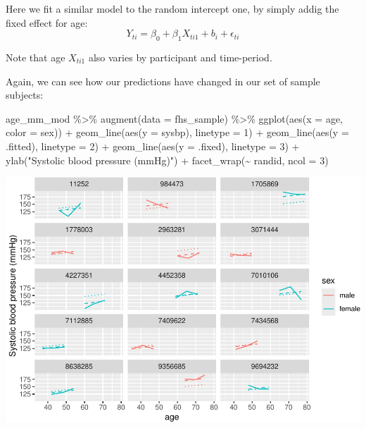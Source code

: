 \documentclass[
]{book}
\newenvironment{Shaded}{\begin{snugshade}}{\end{snugshade}}
\newcommand{\AttributeTok}[1]{\textcolor[rgb]{0.77,0.63,0.00}{#1}}
\newcommand{\DecValTok}[1]{\textcolor[rgb]{0.00,0.00,0.81}{#1}}
\newcommand{\FunctionTok}[1]{\textcolor[rgb]{0.00,0.00,0.00}{#1}}
\newcommand{\NormalTok}[1]{#1}
\newcommand{\SpecialCharTok}[1]{\textcolor[rgb]{0.00,0.00,0.00}{#1}}
\newcommand{\StringTok}[1]{\textcolor[rgb]{0.31,0.60,0.02}{#1}}
\begin{document}
Here we fit a similar model to the random intercept one, by simply addig the fixed
effect for age:
\[
Y_{ti} = \beta_{0} + \beta_{1}X_{ti1} + b_{i} + \epsilon_{ti}
\]

Note that age \(X_{ti1}\) also varies by participant and time-period.

Again, we can see how our predictions have changed in our set of sample
subjects:

\begin{Shaded}
\begin{Highlighting}[]
\NormalTok{age\_mm\_mod }\SpecialCharTok{\%\textgreater{}\%} 
  \FunctionTok{augment}\NormalTok{(}\AttributeTok{data =}\NormalTok{ fhs\_sample) }\SpecialCharTok{\%\textgreater{}\%} 
  \FunctionTok{ggplot}\NormalTok{(}\FunctionTok{aes}\NormalTok{(}\AttributeTok{x =}\NormalTok{ age, }\AttributeTok{color =}\NormalTok{ sex)) }\SpecialCharTok{+} 
  \FunctionTok{geom\_line}\NormalTok{(}\FunctionTok{aes}\NormalTok{(}\AttributeTok{y =}\NormalTok{ sysbp), }\AttributeTok{linetype =} \DecValTok{1}\NormalTok{) }\SpecialCharTok{+} 
  \FunctionTok{geom\_line}\NormalTok{(}\FunctionTok{aes}\NormalTok{(}\AttributeTok{y =}\NormalTok{ .fitted), }\AttributeTok{linetype =} \DecValTok{2}\NormalTok{) }\SpecialCharTok{+} 
  \FunctionTok{geom\_line}\NormalTok{(}\FunctionTok{aes}\NormalTok{(}\AttributeTok{y =}\NormalTok{ .fixed), }\AttributeTok{linetype =} \DecValTok{3}\NormalTok{) }\SpecialCharTok{+}
  \FunctionTok{ylab}\NormalTok{(}\StringTok{"Systolic blood pressure (mmHg)"}\NormalTok{) }\SpecialCharTok{+} 
  \FunctionTok{facet\_wrap}\NormalTok{(}\SpecialCharTok{\textasciitilde{}}\NormalTok{ randid, }\AttributeTok{ncol =} \DecValTok{3}\NormalTok{)}
\end{Highlighting}
\end{Shaded}

\includegraphics{adv_epi_analysis_files/figure-latex/unnamed-chunk-297-1.pdf}
\end{document}
